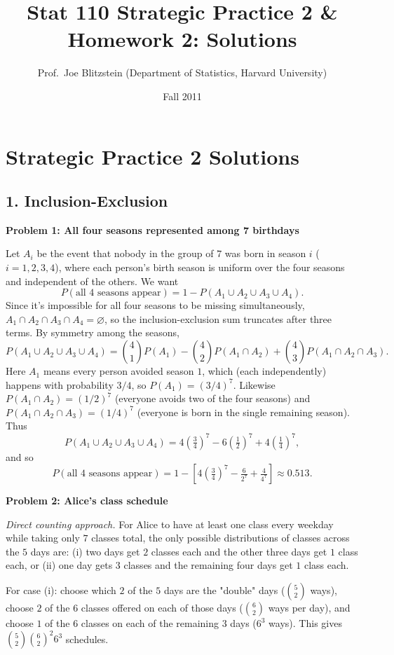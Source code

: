 \documentclass{article}
\title{Stat 110 Strategic Practice 2 \& Homework 2: Solutions}
\author{Prof.\ Joe Blitzstein (Department of Statistics, Harvard University)}
\date{Fall 2011}
\begin{document}
\maketitle

\section*{Strategic Practice 2 Solutions}

\subsection*{1. Inclusion-Exclusion}

\textbf{Problem 1: All four seasons represented among 7 birthdays}

Let $A_i$ be the event that nobody in the group of $7$ was born in season $i$ ($i=1,2,3,4$), where each person's birth season is uniform over the four seasons and independent of the others. We want
$$P(\text{all 4 seasons appear}) = 1 - P(A_1 \cup A_2 \cup A_3 \cup A_4).$$
Since it's impossible for all four seasons to be missing simultaneously, $A_1 \cap A_2 \cap A_3 \cap A_4 = \varnothing$, so the inclusion-exclusion sum truncates after three terms. By symmetry among the seasons,
$$
P(A_1 \cup A_2 \cup A_3 \cup A_4) = \binom{4}{1}P(A_1) - \binom{4}{2}P(A_1\cap A_2) + \binom{4}{3}P(A_1\cap A_2\cap A_3).
$$
Here $A_1$ means every person avoided season $1$, which (each independently) happens with probability $3/4$, so $P(A_1) = (3/4)^7$. Likewise $P(A_1\cap A_2) = (1/2)^7$ (everyone avoids two of the four seasons) and $P(A_1\cap A_2 \cap A_3) = (1/4)^7$ (everyone is born in the single remaining season). Thus
$$P(A_1\cup A_2\cup A_3\cup A_4) = 4\left(\tfrac{3}{4}\right)^7 - 6\left(\tfrac{1}{2}\right)^7 + 4\left(\tfrac{1}{4}\right)^7,$$
and so
$$P(\text{all 4 seasons appear}) = 1 - \left[4\left(\tfrac{3}{4}\right)^7 - \tfrac{6}{2^7} + \tfrac{4}{4^7}\right] \approx 0.513.$$

\bigskip
\textbf{Problem 2: Alice's class schedule}

\emph{Direct counting approach.} For Alice to have at least one class every weekday while taking only $7$ classes total, the only possible distributions of classes across the $5$ days are: (i) two days get $2$ classes each and the other three days get $1$ class each, or (ii) one day gets $3$ classes and the remaining four days get $1$ class each.

For case (i): choose which $2$ of the $5$ days are the "double" days ($\binom{5}{2}$ ways), choose $2$ of the $6$ classes offered on each of those days ($\binom{6}{2}$ ways per day), and choose $1$ of the $6$ classes on each of the remaining $3$ days ($6^3$ ways). This gives $\binom{5}{2}\binom{6}{2}^2 6^3$ schedules.
\end{document}
